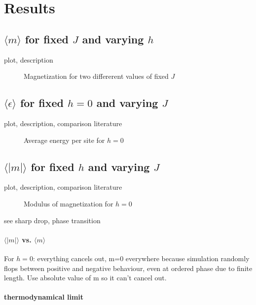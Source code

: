 \documentclass{scrartcl}
\begin{document}
\section{Results}

\subsection{$\langle m\rangle$ for fixed $J$ and varying $h$}
plot, description

	\begin{figure}[htbp]
		
		\caption{Magnetization for two differerent values of fixed $J$}
		\label{fig:magfixJ}
	\end{figure}

\subsection{$\langle \epsilon\rangle$ for fixed $h=0$ and varying $J$}
plot, description, comparison literature
	\begin{figure}[htbp]
		
		\caption{Average energy per site for $h=0$}
		\label{fig:energy}
	\end{figure}

\subsection{$\langle |m|\rangle$ for fixed $h$ and varying $J$}
plot, description, comparison literature

	\begin{figure}[htbp]
		
		\caption{Modulus of magnetization for $h=0$}
		\label{fig:absmag}
	\end{figure}
see sharp drop, phase transition
\paragraph{$\langle |m|\rangle$ vs. $\langle m\rangle$}
For $h=0$: everything cancels out, m=0 everywhere because simulation randomly flops between positive and negative behaviour, even at ordered phase due to finite length.
Use absolute value of m so it can't cancel out.

\paragraph{thermodynamical limit}



\newpage	
\listoffigures
\printbibliography
\end{document}
